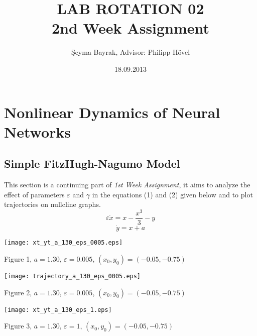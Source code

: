 \documentclass{article}
\begin{document}
\title{LAB ROTATION 02 \\ 2nd Week Assignment }
\date{18.09.2013}
\author{\c{S}eyma Bayrak, Advisor: Philipp H\"{o}vel}
\maketitle

\section{Nonlinear Dynamics of Neural Networks}
\subsection{Simple FitzHugh-Nagumo Model}
This section is a continuing part of \textit{1st Week Assignment}, it aims to analyze the effect of parameters $\varepsilon$ and $\gamma$ in the equations (1) and (2) given below and to plot trajectories on nullcline graphs. 
\begin{equation}
 \varepsilon \dot{x} = x- \frac{x^3}{3}-y 
\end{equation}
\begin{equation}
 \dot{y}=x+a 
\end{equation} 

\begin{center}
\texttt{[image: xt\_yt\_a\_130\_eps\_0005.eps]}
\begin{footnotesize}
 Figure 1, $a=1.30$, $\varepsilon=0.005$, $(x_0,y_0)=(-0.05,-0.75)$
\end{footnotesize}
\end{center}

\begin{center}
\texttt{[image: trajectory\_a\_130\_eps\_0005.eps]}
\begin{footnotesize}
 Figure 2, $a=1.30$, $\varepsilon=0.005$, $(x_0,y_0)=(-0.05,-0.75)$
\end{footnotesize}
\end{center}

\begin{center}
\texttt{[image: xt\_yt\_a\_130\_eps\_1.eps]}
\begin{footnotesize}
 Figure 3, $a=1.30$, $\varepsilon=1$, $(x_0,y_0)=(-0.05,-0.75)$
\end{footnotesize}
\end{center}
\end{document}
